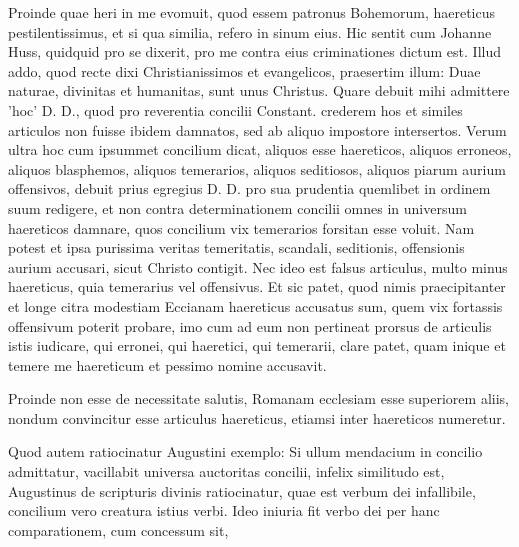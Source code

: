 Proinde quae heri in me evomuit, quod essem patronus Bohemorum, haereticus pestilentissimus, et si qua similia, refero in sinum eius. Hic sentit cum Johanne Huss, quidquid pro se dixerit, pro me contra eius criminationes dictum est. Illud addo, quod recte dixi Christianissimos et evangelicos, praesertim illum: Duae naturae, divinitas et humanitas, sunt unus Christus. Quare debuit mihi admittere 'hoc' D. D., quod pro reverentia concilii Constant. crederem hos et similes articulos non fuisse ibidem damnatos, sed ab aliquo impostore intersertos. Verum ultra hoc cum ipsummet concilium dicat, aliquos esse haereticos, aliquos erroneos, aliquos blasphemos, aliquos temerarios, aliquos seditiosos, aliquos piarum aurium offensivos, debuit prius egregius D. D. pro sua prudentia quemlibet in ordinem suum redigere, et non contra determinationem concilii omnes in universum haereticos damnare, quos concilium vix temerarios forsitan esse voluit. Nam potest et ipsa purissima veritas temeritatis, scandali, seditionis, offensionis aurium accusari, sicut Christo contigit. Nec ideo est falsus articulus, multo minus haereticus, quia temerarius vel offensivus. Et sic patet, quod nimis praecipitanter et longe citra modestiam Eccianam haereticus accusatus sum, quem vix fortassis offensivum poterit probare, imo cum ad eum non pertineat prorsus de articulis istis iudicare, qui erronei, qui haeretici, qui temerarii, clare patet, quam inique et temere me haereticum et pessimo nomine accusavit.

Proinde non esse de necessitate salutis, Romanam ecclesiam esse superiorem aliis, nondum convincitur esse articulus haereticus, etiamsi inter haereticos numeretur.

Quod autem ratiocinatur Augustini exemplo: Si ullum mendacium in concilio admittatur, vacillabit universa auctoritas concilii, infelix similitudo est, Augustinus de scripturis divinis ratiocinatur, quae est verbum dei infallibile, concilium vero creatura istius verbi. Ideo iniuria fit verbo dei per hanc comparationem, cum concessum sit,

